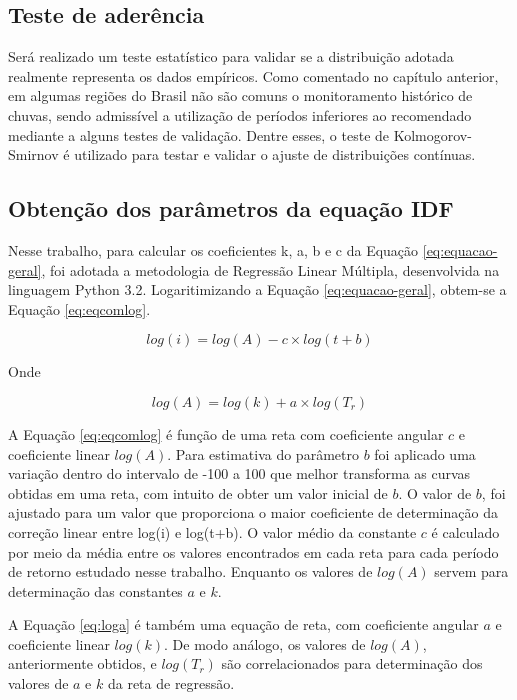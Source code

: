 \subsection{Teste de aderência}

Será realizado um teste estatístico para validar se a distribuição adotada realmente representa os dados empíricos. Como comentado no capítulo anterior, em algumas regiões do Brasil não são comuns o monitoramento histórico de chuvas, sendo admissível a utilização de períodos inferiores ao recomendado mediante a alguns testes de validação. Dentre esses, o teste de Kolmogorov-Smirnov é utilizado para testar e validar o ajuste de distribuições contínuas.

\subsection{Obtenção dos parâmetros da equação IDF}

Nesse trabalho, para calcular os coeficientes k, a, b e c da Equação \ref{eq:equacao-geral}, foi adotada a metodologia de Regressão Linear Múltipla, desenvolvida na linguagem Python 3.2. Logaritimizando a Equação \ref{eq:equacao-geral}, obtem-se a Equação \ref{eq:eqcomlog}.

\begin{equation}
\label{eq:eqcomlog}
    log(i) = log(A) - c \times log(t+b)
\end{equation}

Onde

\begin{equation}
    \label{eq:loga}
    log(A) = log(k) + a \times log(T_r)
\end{equation}

A Equação \ref{eq:eqcomlog} é função de uma reta com coeficiente angular $c$ e coeficiente linear $log(A)$. Para estimativa do parâmetro $b$ foi aplicado uma variação dentro do intervalo de -100 a 100 que melhor transforma as curvas obtidas em uma reta, com intuito de obter um valor inicial de $b$. O valor de $b$, foi ajustado para um valor que proporciona o maior coeficiente de determinação da correção linear entre log(i) e log(t+b). O valor médio da constante $c$ é calculado por meio da média entre os valores encontrados em cada reta para cada período de retorno estudado nesse trabalho. Enquanto os valores de $log(A)$ servem para determinação das constantes $a$ e $k$.

A Equação \ref{eq:loga} é também uma equação de reta, com coeficiente angular $a$ e coeficiente linear $log(k)$. De modo análogo, os valores de $log(A)$, anteriormente obtidos, e $log(T_r)$ são correlacionados para determinação dos valores de $a$ e $k$ da reta de regressão.